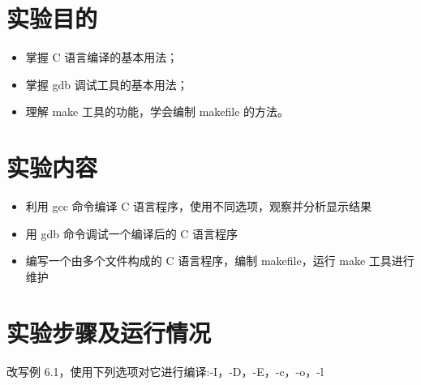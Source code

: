 \documentclass{JNUexp}
\begin{document}
 

\section{实验目的}
\begin{itemize}
    \item 掌握 C 语言编译的基本用法；
    \item 掌握 gdb 调试工具的基本用法；
    \item 理解 make 工具的功能，学会编制 makefile 的方法。
    
\end{itemize}

\section{实验内容}
\begin{itemize}
    \item 利用 gcc 命令编译 C 语言程序，使用不同选项，观察并分析显示结果
    \item 用 gdb 命令调试一个编译后的 C 语言程序
    \item 编写一个由多个文件构成的 C 语言程序，编制 makefile，运行 make 工具进行维护
\end{itemize}
\section{实验步骤及运行情况}
\begin{problem}
    改写例 6.1，使用下列选项对它进行编译:-I，-D，-E，-c，-o，-l
\end{problem}
\end{document}
